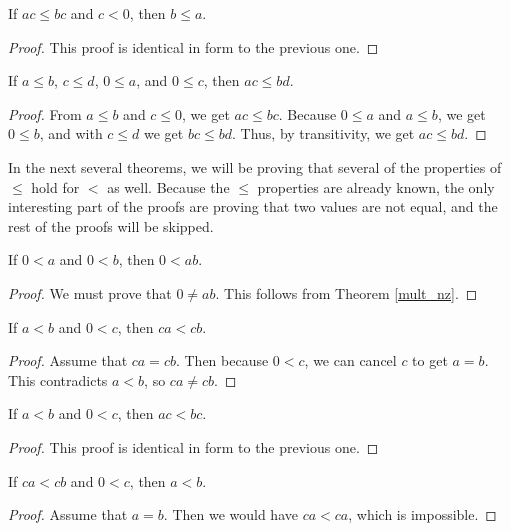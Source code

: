 \documentclass[../../math.tex]{subfiles}
\begin{document}
\begin{theorem} \label{le_mult_rcancel_neg}
    If $ac \leq bc$ and $c < 0$, then $b \leq a$.
\end{theorem}
\begin{proof}
    This proof is identical in form to the previous one.
\end{proof}

\begin{theorem} \label{le_lrmult_pos}
    If $a \leq b$, $c \leq d$, $0 \leq a$, and $0 \leq c$, then $ac \leq bd$.
\end{theorem}
\begin{proof}
    From $a \leq b$ and $c \leq 0$, we get $ac \leq bc$.  Because $0 \leq a$ and
    $a \leq b$, we get $0 \leq b$, and with $c \leq d$ we get $bc \leq bd$.
    Thus, by transitivity, we get $ac \leq bd$.
\end{proof}

In the next several theorems, we will be proving that several of the properties
of $\leq$ hold for $<$ as well.  Because the $\leq$ properties are already
known, the only interesting part of the proofs are proving that two values are
not equal, and the rest of the proofs will be skipped.

\begin{theorem}
    If $0 < a$ and $0 < b$, then $0 < ab$.
\end{theorem}
\begin{proof}
    We must prove that $0 \neq ab$.  This follows from Theorem \ref{mult_nz}.
\end{proof}

\begin{theorem}
    If $a < b$ and $0 < c$, then $ca < cb$.
\end{theorem}
\begin{proof}
    Assume that $ca = cb$.  Then because $0 < c$, we can cancel $c$ to get $a =
    b$.  This contradicts $a < b$, so $ca \neq cb$.
\end{proof}

\begin{theorem}
    If $a < b$ and $0 < c$, then $ac < bc$.
\end{theorem}
\begin{proof}
    This proof is identical in form to the previous one.
\end{proof}

\begin{theorem}
    If $ca < cb$ and $0 < c$, then $a < b$.
\end{theorem}
\begin{proof}
    Assume that $a = b$.  Then we would have $ca < ca$, which is impossible.
\end{proof}
\end{document}

